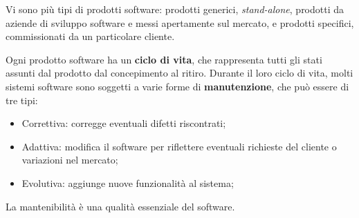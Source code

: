 \documentclass[10pt,a4paper]{article}
\newcommand{\strong}[1]{\textbf{#1}}
\newcommand{\frgnword}[1]{\textit{#1}}
\begin{document}
Vi sono più tipi di prodotti software: prodotti generici, \frgnword{stand-alone}, prodotti da aziende di sviluppo software e messi apertamente sul mercato, e prodotti specifici, commissionati da un particolare cliente.

Ogni prodotto software ha un \strong{\gls{ciclo di vita}}, che rappresenta tutti gli stati assunti dal prodotto dal concepimento al ritiro. Durante il loro ciclo di vita, molti sistemi software sono soggetti a varie forme di \strong{manutenzione}, che può essere di tre tipi: 

\begin{itemize}
	\item Correttiva: corregge eventuali difetti riscontrati;
	\item Adattiva: modifica il software per riflettere eventuali richieste del cliente o variazioni nel mercato;
	\item Evolutiva: aggiunge nuove funzionalità al sistema;
\end{itemize}

La mantenibilità è una qualità essenziale del software.

\end{document}
